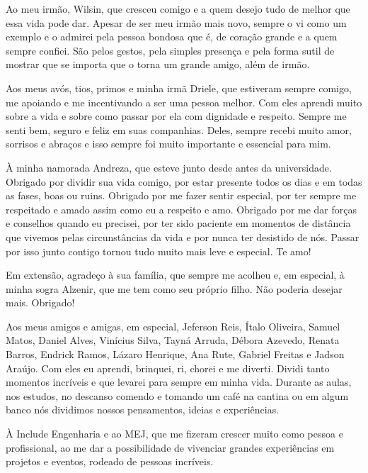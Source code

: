 \begin{trivlist}
  \item Ao meu irmão, Wilsin, que cresceu comigo e a quem desejo tudo de melhor que essa vida pode dar. Apesar de ser meu irmão mais novo, sempre o vi como um exemplo e o admirei pela pessoa bondosa que é, de coração grande e a quem sempre confiei. São pelos gestos, pela simples presença e pela forma sutil de mostrar que se importa que o torna um grande amigo, além de irmão.

  \item Aos meus avós, tios, primos e minha irmã Driele, que estiveram sempre comigo, me apoiando e me incentivando a ser uma pessoa melhor. Com eles aprendi muito sobre a vida e sobre como passar por ela com dignidade e respeito. Sempre me senti bem, seguro e feliz em suas companhias. Deles, sempre recebi muito amor, sorrisos e abraços e isso sempre foi muito importante e essencial para mim.

  \item À minha namorada Andreza, que esteve junto desde antes da universidade. Obrigado por dividir sua vida comigo, por estar presente todos os dias e em todas as fases, boas ou ruins. Obrigado por me fazer sentir especial, por ter sempre me respeitado e amado assim como eu a respeito e amo. Obrigado por me dar forças e conselhos quando eu precisei, por ter sido paciente em momentos de distância que vivemos pelas circunstâncias da vida e por nunca ter desistido de nós. Passar por isso junto contigo tornou tudo muito mais leve e especial. Te amo!

  \item Em extensão, agradeço à sua família, que sempre me acolheu e, em especial, à minha sogra Alzenir, que me tem como seu próprio filho. Não poderia desejar mais. Obrigado!
  
  \item Aos meus amigos e amigas, em especial, Jeferson Reis, Ítalo Oliveira, Samuel Matos, Daniel Alves, Vinícius Silva, Tayná Arruda, Débora Azevedo, Renata Barros, Endrick Ramos, Lázaro Henrique, Ana Rute, Gabriel Freitas e Jadson Araújo. Com eles eu aprendi, brinquei, ri, chorei e me diverti. Dividi tanto momentos incríveis e que levarei para sempre em minha vida. Durante as aulas, nos estudos, no descanso comendo e tomando um café na cantina ou em algum banco nós dividimos nossos pensamentos, ideias e experiências.

  \item À Include Engenharia e ao MEJ, que me fizeram crescer muito como pessoa e profissional, ao me dar a possibilidade de vivenciar grandes experiências em projetos e eventos, rodeado de pessoas incríveis.


\end{trivlist}

